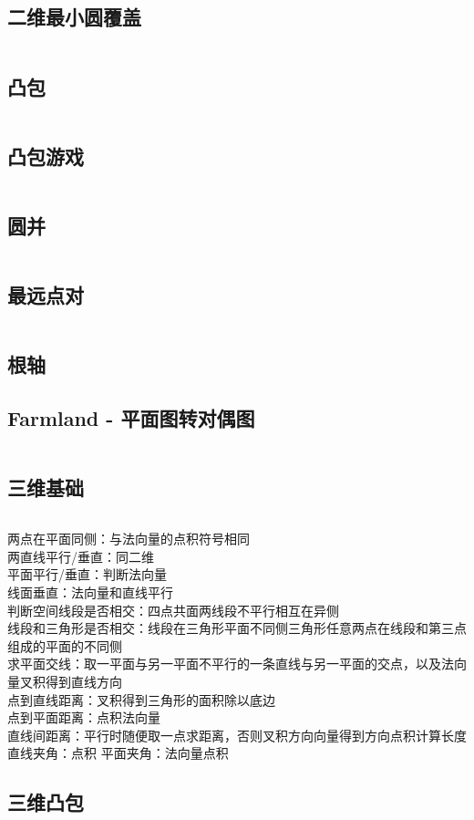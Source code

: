 \subsection{二维最小圆覆盖}
\inputminted[breaklines]{cpp}{./computational_geometry/2D-minimum-circle-coverage.cpp}
\subsection{凸包}
\inputminted[breaklines]{cpp}{./computational_geometry/convex_hull.cpp}
\subsection{凸包游戏}
\inputminted[breaklines]{cpp}{./computational_geometry/convex_hull_game.cpp}
\subsection{圆并}
\inputminted[breaklines]{cpp}{./computational_geometry/circle_union.cpp}
\subsection{最远点对}
\inputminted[breaklines]{cpp}{./computational_geometry/farthest_point_pair.cpp}
\subsection{根轴}

\subsection{Farmland - 平面图转对偶图}
\inputminted[breaklines]{cpp}{./computational_geometry/Farmland.cpp}
\subsection{三维基础}
	\inputminted[breaklines]{cpp}{./computational_geometry/three_dimensions_basic.cpp}
	两点在平面同侧：与法向量的点积符号相同 \\
	两直线平行/垂直：同二维 \\
	平面平行/垂直：判断法向量 \\
	线面垂直：法向量和直线平行 \\
	判断空间线段是否相交：四点共面两线段不平行相互在异侧 \\
	线段和三角形是否相交：线段在三角形平面不同侧三角形任意两点在线段和第三点组成的平面的不同侧 \\
	求平面交线：取一平面与另一平面不平行的一条直线与另一平面的交点，以及法向量叉积得到直线方向 \\
	点到直线距离：叉积得到三角形的面积除以底边 \\
	点到平面距离：点积法向量 \\
	直线间距离：平行时随便取一点求距离，否则叉积方向向量得到方向点积计算长度 \\
	直线夹角：点积  平面夹角：法向量点积
\subsection{三维凸包}
\inputminted[breaklines]{cpp}{./computational_geometry/convex_hull_3dim.cpp}